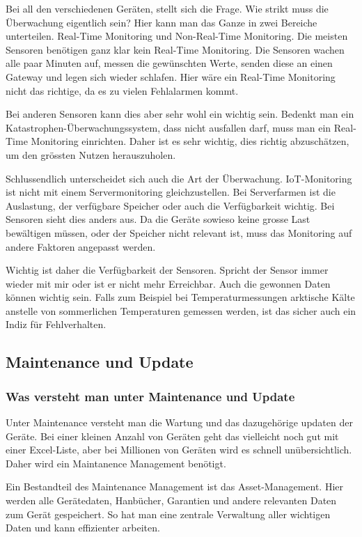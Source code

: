 Bei all den verschiedenen Geräten, stellt sich die Frage. Wie strikt muss die Überwachung eigentlich sein? Hier kann man das Ganze in zwei Bereiche unterteilen. Real-Time Monitoring und Non-Real-Time Monitoring. Die meisten Sensoren benötigen ganz klar kein Real-Time Monitoring. Die Sensoren wachen alle paar Minuten auf, messen die gewünschten Werte, senden diese an einen Gateway und legen sich wieder schlafen. Hier wäre ein Real-Time Monitoring nicht das richtige, da es zu vielen Fehlalarmen kommt. 

Bei anderen Sensoren kann dies aber sehr wohl ein wichtig sein. Bedenkt man ein Katastrophen-Überwachungssystem, dass nicht ausfallen darf, muss man ein Real-Time Monitoring einrichten. Daher ist es sehr wichtig, dies richtig abzuschätzen, um den grössten Nutzen herauszuholen.

Schlussendlich unterscheidet sich auch die Art der Überwachung. IoT-Monitoring ist nicht mit einem Servermonitoring gleichzustellen. Bei Serverfarmen ist die Auslastung, der verfügbare Speicher oder auch die Verfügbarkeit wichtig. Bei Sensoren sieht dies anders aus. Da die Geräte sowieso keine grosse Last bewältigen müssen, oder der Speicher nicht relevant ist, muss das Monitoring auf andere Faktoren angepasst werden. 

Wichtig ist daher die Verfügbarkeit der Sensoren. Spricht der Sensor immer wieder mit mir oder ist er nicht mehr Erreichbar. Auch die gewonnen Daten können wichtig sein. Falls zum Beispiel bei Temperaturmessungen arktische Kälte anstelle von sommerlichen Temperaturen gemessen werden, ist das sicher auch ein Indiz für Fehlverhalten.\cite{MonTypes}

\subsection{Maintenance und Update}
\subsubsection{Was versteht man unter Maintenance und Update}
Unter Maintenance versteht man die Wartung und das dazugehörige updaten der Geräte. Bei einer kleinen Anzahl von Geräten geht das vielleicht noch gut mit einer Excel-Liste, aber bei Millionen von Geräten wird es schnell unübersichtlich. Daher wird ein Maintanence Management benötigt.

Ein Bestandteil des Maintenance Management ist das Asset-Management. Hier werden alle Gerätedaten, Hanbücher, Garantien und andere relevanten Daten zum Gerät gespeichert.\cite{MainAsset} So hat man eine zentrale Verwaltung aller wichtigen Daten und kann effizienter arbeiten.

